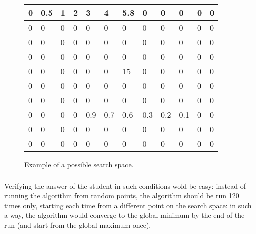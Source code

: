 \begin{figure}[H]
    \begin{center}
        \begin{tabular}{ | p{3.8mm} | p{3.8mm} | p{3.8mm} | p{3.8mm} | p{3.8mm} | p{3.8mm} | p{3.8mm} | p{3.8mm} | p{3.8mm} | p{3.8mm} | p{3.8mm} | p{3.8mm} | }
            \hline
            0 & \cellcolor{red}0.5 & \cellcolor{dandelion}1 & \cellcolor{dandelion}2 & \cellcolor{dandelion}3 & \cellcolor{dandelion}4 & \cellcolor{limegreen}5.8 & 0 & 0 & 0 & 0 & 0 \\
            \hline
            0 & 0 & 0 & 0 & 0 & 0 & 0 & 0 & 0 & 0 & 0 & 0 \\
            \hline
            0 & 0 & 0 & 0 & 0 & 0 & 0 & 0 & 0 & 0 & 0 & 0 \\
            \hline
            0 & 0 & 0 & 0 & 0 & 0 & 0 & 0 & 0 & 0 & 0 & 0 \\
            \hline
            0 & 0 & 0 & 0 & 0 & 0 & \cellcolor{blue}15 & 0 & 0 & 0 & 0 & 0 \\
            \hline
            0 & 0 & 0 & 0 & 0 & 0 & 0 & 0 & 0 & 0 & 0 & 0 \\
            \hline
            0 & 0 & 0 & 0 & 0 & 0 & 0 & 0 & 0 & 0 & 0 & 0 \\
            \hline
            0 & 0 & 0 & 0 & \cellcolor{limegreen}0.9 & \cellcolor{dandelion}0.7 & \cellcolor{dandelion}0.6 & \cellcolor{dandelion}0.3 & \cellcolor{dandelion}0.2 & \cellcolor{red}0.1 & 0 & 0 \\
            \hline
            0 & 0 & 0 & 0 & 0 & 0 & 0 & 0 & 0 & 0 & 0 & 0 \\
            \hline
            0 & 0 & 0 & 0 & 0 & 0 & 0 & 0 & 0 & 0 & 0 & 0 \\
            \hline
        \end{tabular}
    \end{center}
    \caption{Example of a possible search space.} \label{fig:counter_example}
\end{figure}

\subsubsection{}
Verifying the answer of the student in such conditions wold be easy: instead of running the algorithm from random points, the algorithm should be run 120 times only, starting each time from a different point on the search space: in such a way, the algorithm would converge to the global minimum by the end of the run (and start from the global maximum once).

